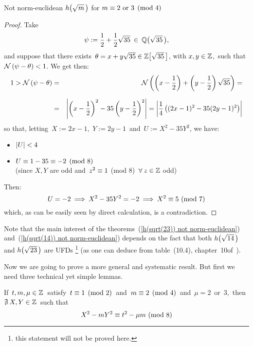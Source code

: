 \begin{subsection}{Not norm-euclidean $\hh{m}$ for %
                   $m \equiv 2 \text{ or } 3 \pmod 4$}
\begin{proof}

Take
$$ \psi:= \frac{1}{2} + \frac{1}{2} \sqrt{35} \:\in\: \QQ{35}, $$
and suppose that there exists\,
$\theta = x + y\sqrt{35} \in \ZZ{35}$, with $x, y\in\mathbb{Z}$,
\,such that\, $\mathcal{N}\left(\psi - \theta\right) < 1$.
We get then:
%
\begin{eqnarray*}
1 > \mathcal{N}\left(\psi - \theta\right) & = &
\mathcal{N}\left(\left(x - \frac{1}{2}\right) +
\left(y - \frac{1}{2}\right)\sqrt{35}\right) = \\[7pt]
& = & \left|\left(x - \frac{1}{2}\right)^2
- 35\left(y - \frac{1}{2}\right)^2\right| =
\left|\frac{1}{4}\left((2x - 1)^2 - 35(2y - 1)^2\right)\right|
\end{eqnarray*}
%
so that, letting\, $X:= 2x - 1$,\, $Y:= 2y - 1$\,
and\, $U:= X^2 - 35Y^2$, we have:
\begin{itemize}

\item $\left|U\right| < 4$

\item $U \equiv 1 - 35 \equiv -2 \pmod 8$\\
(since $X,Y$ are odd and\, $z^2 \equiv 1$
(mod $8$)\, $\forall\: z \in \mathbb{Z}$ odd)

\end{itemize}

Then:
$$
U = -2 \:\Longrightarrow\: X^2 - 35Y^2 = -2 \:\Longrightarrow\:
X^2 \equiv 5\ (\mathrm{mod}\ 7)
$$
%
which, as can be easily seen by direct calculation, is a contradiction.
\end{proof}

\smallskip
Note that the main interest of the
theorems~(\ref{h(sqrt(23)) not norm-euclidean})
and~(\ref{h(sqrt(14)) not norm-euclidean})
depends on the fact that both $\hh{14}$ and $\hh{23}$ are UFDs%
\footnote{this statement will not be proved here.}
(as one can deduce from table~(10.4), chapter~10\linebreak of~\cite{S&T}).

\bigskip
Now we are going to prove a more general and systematic result.
But first we need three technical yet simple lemmas.


\begin{lem}\label{tech1}
If\, $t, m, \mu \in \mathbb{Z}$\, satisfy\, $t \equiv 1 \pmod 2$
\,and\, $m \equiv 2 \pmod 4$ \,and\, $\mu = 2$ \,or\, $3$,\,
then\, $\nexists\: X, Y \in \mathbb{Z}$\, such that
\begin{equation}\label{tech1_eq}
X^2 - mY^2 \equiv t^2 - \mu m\ \mathrm{(mod\ 8)}
\end{equation}
\end{lem}


\end{subsection}
